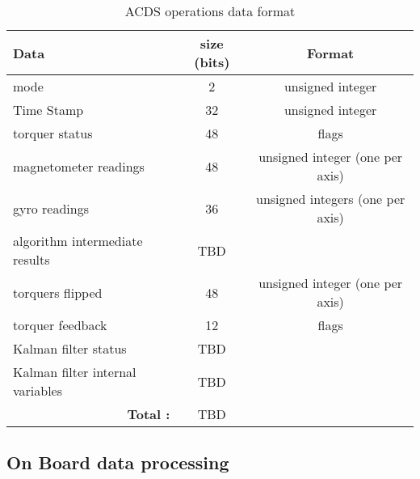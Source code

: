 \begin{comment}
\begin{itemize}
    \item magnetometer and gyro readings
    \item torquer status
    \item mode
    \item algorithm intermediate results
    \item torquers flipped
    \item torquer feedback
    \item Kalman filter status
    \item Kalman filter internal variables
    \item Kalman filter state
    \item \todo[inline]{More?}
\end{itemize}
\end{comment}

\begin{table}[H]
    \begin{tabular}{|l|c|c|}
        \hline
        Data&size (bits)&Format\\
        \hline
        mode&2&unsigned integer\\
        \hline
        Time Stamp&32&unsigned integer\\
        \hline
        torquer status&48&flags\\
        \hline
        magnetometer readings&48&unsigned integer (one per axis)\\
        \hline
        gyro readings&36&unsigned integers (one per axis)\\
        \hline
        algorithm intermediate results&TBD&\\
        \hline
        torquers flipped&48&unsigned integer (one per axis)\\
        \hline
        torquer feedback&12&flags\\
        \hline
        Kalman filter status&TBD&\\
        \hline
        Kalman filter internal variables&TBD&\\
        \hline
        \multicolumn{1}{|r|}{\bfseries Total :}&TBD&\\
        \hline
    \end{tabular}
    \caption{\ac{ACDS} operations data format}
    \label{tab:logdat}
\end{table}

\subsection{On Board data processing}

